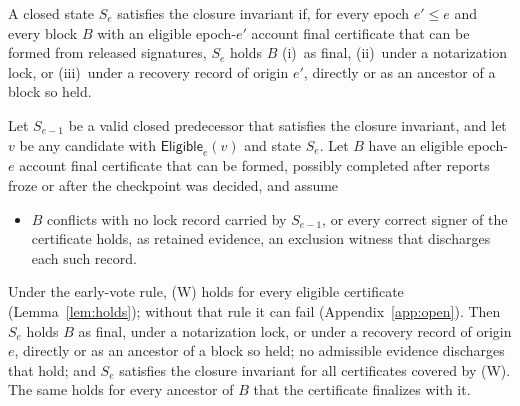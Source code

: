 \documentclass[conference]{IEEEtran}
\newcommand{\Elig}{\mathsf{Eligible}}
\begin{document}
\begin{definition}
\label{def:invariant}
A closed state $S_e$ satisfies the closure invariant if, for every epoch $e'\le e$ and every block $B$ with an eligible epoch-$e'$ account final certificate that can be formed from released signatures, $S_e$ holds $B$ (i)~as final, (ii)~under a notarization lock, or (iii)~under a recovery record of origin $e'$, directly or as an ancestor of a block so held.
\end{definition}

\begin{theorem}
\label{thm:closure}
Let $S_{e-1}$ be a valid closed predecessor that satisfies the closure invariant, and let $v$ be any candidate with $\Elig_e(v)$ and state $S_e$. Let $B$ have an eligible epoch-$e$ account final certificate that can be formed, possibly completed after reports froze or after the checkpoint was decided, and assume
\begin{itemize}
\item[(W)] $B$ conflicts with no lock record carried by $S_{e-1}$, or every correct signer of the certificate holds, as retained evidence, an exclusion witness that discharges each such record.
\end{itemize}
Under the early-vote rule, (W) holds for every eligible certificate (Lemma~\ref{lem:holds}); without that rule it can fail (Appendix~\ref{app:open}). Then $S_e$ holds $B$ as final, under a notarization lock, or under a recovery record of origin $e$, directly or as an ancestor of a block so held; no admissible evidence discharges that hold; and $S_e$ satisfies the closure invariant for all certificates covered by (W). The same holds for every ancestor of $B$ that the certificate finalizes with it.
\end{theorem}
\end{document}
